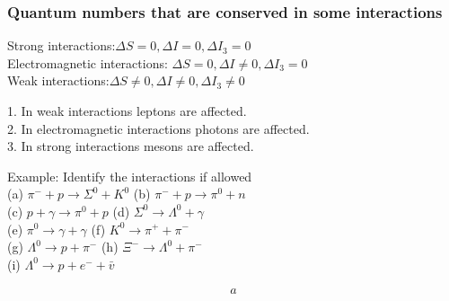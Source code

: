 \subsubsection{Quantum numbers that are conserved in some interactions}
Strong interactions:\hspace{3cm}$\Delta S=0, \Delta I=0, \Delta I_3=0$\\
Electromagnetic interactions:\hspace{1.3cm} $\Delta S=0, \Delta I \neq 0, \Delta I_3=0$\\
Weak interactions:\hspace{3.1cm}$\Delta S \neq 0, \Delta I \neq 0, \Delta I_3 \neq 0$
\begin{note}
	1. In weak interactions leptons are affected.\\
	2. In electromagnetic interactions photons are affected.\\
	3. In strong interactions mesons are affected.\\
\end{note}
\begin{exercise}
	Example: Identify the interactions if allowed\\
	(a) $\pi^{-}+p \rightarrow \Sigma^0+K^0$\hspace{2cm}
	(b) $\pi^{-}+p \rightarrow \pi^0+n$\\
	(c) $p+\gamma \rightarrow \pi^0+p$\hspace{2.5cm}
	(d) $\Sigma^0 \rightarrow \Lambda^0+\gamma$\\
	(e) $\pi^0 \rightarrow \gamma+\gamma$\hspace{3.2cm}
	(f) $K^0 \rightarrow \pi^{+}+\pi^{-}$\\
	(g) $\Lambda^0 \rightarrow p+\pi^{-}$\hspace{2.8cm}
	(h) $\Xi^{-} \rightarrow \Lambda^0+\pi^{-}$\\
	(i) $\Lambda^0 \rightarrow p+e^{-}+\bar{v}$
\end{exercise}
\begin{answer}
	\begin{align*}
	a
	\end{align*}
\end{answer}









